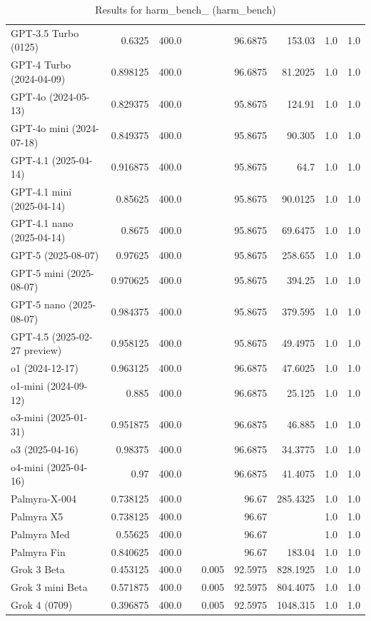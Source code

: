 \begin{table}[htp]
{\begin{tabular}{lrrrrrrrr}
GPT-3.5 Turbo (0125) & 0.6325 & 400.0 &  &  & 96.6875 & 153.03 & 1.0 & 1.0 \\
GPT-4 Turbo (2024-04-09) & 0.898125 & 400.0 &  &  & 96.6875 & 81.2025 & 1.0 & 1.0 \\
GPT-4o (2024-05-13) & 0.829375 & 400.0 &  &  & 95.8675 & 124.91 & 1.0 & 1.0 \\
GPT-4o mini (2024-07-18) & 0.849375 & 400.0 &  &  & 95.8675 & 90.305 & 1.0 & 1.0 \\
GPT-4.1 (2025-04-14) & 0.916875 & 400.0 &  &  & 95.8675 & 64.7 & 1.0 & 1.0 \\
GPT-4.1 mini (2025-04-14) & 0.85625 & 400.0 &  &  & 95.8675 & 90.0125 & 1.0 & 1.0 \\
GPT-4.1 nano (2025-04-14) & 0.8675 & 400.0 &  &  & 95.8675 & 69.6475 & 1.0 & 1.0 \\
GPT-5 (2025-08-07) & 0.97625 & 400.0 &  &  & 95.8675 & 258.655 & 1.0 & 1.0 \\
GPT-5 mini (2025-08-07) & 0.970625 & 400.0 &  &  & 95.8675 & 394.25 & 1.0 & 1.0 \\
GPT-5 nano (2025-08-07) & 0.984375 & 400.0 &  &  & 95.8675 & 379.595 & 1.0 & 1.0 \\
GPT-4.5 (2025-02-27 preview) & 0.958125 & 400.0 &  &  & 95.8675 & 49.4975 & 1.0 & 1.0 \\
o1 (2024-12-17) & 0.963125 & 400.0 &  &  & 96.6875 & 47.6025 & 1.0 & 1.0 \\
o1-mini (2024-09-12) & 0.885 & 400.0 &  &  & 96.6875 & 25.125 & 1.0 & 1.0 \\
o3-mini (2025-01-31) & 0.951875 & 400.0 &  &  & 96.6875 & 46.885 & 1.0 & 1.0 \\
o3 (2025-04-16) & 0.98375 & 400.0 &  &  & 96.6875 & 34.3775 & 1.0 & 1.0 \\
o4-mini (2025-04-16) & 0.97 & 400.0 &  &  & 96.6875 & 41.4075 & 1.0 & 1.0 \\
Palmyra-X-004 & 0.738125 & 400.0 &  &  & 96.67 & 285.4325 & 1.0 & 1.0 \\
Palmyra X5 & 0.738125 & 400.0 &  &  & 96.67 &  & 1.0 & 1.0 \\
Palmyra Med & 0.55625 & 400.0 &  &  & 96.67 &  & 1.0 & 1.0 \\
Palmyra Fin & 0.840625 & 400.0 &  &  & 96.67 & 183.04 & 1.0 & 1.0 \\
Grok 3 Beta & 0.453125 & 400.0 &  & 0.005 & 92.5975 & 828.1925 & 1.0 & 1.0 \\
Grok 3 mini Beta & 0.571875 & 400.0 &  & 0.005 & 92.5975 & 804.4075 & 1.0 & 1.0 \\
Grok 4 (0709) & 0.396875 & 400.0 &  & 0.005 & 92.5975 & 1048.315 & 1.0 & 1.0 \\
\bottomrule
\end{tabular}}
\caption{Results for harm_bench_ (harm_bench)}
\label{fig:harm_bench_ (harm_bench)}
\end{table}